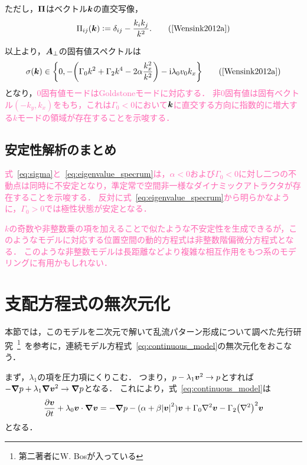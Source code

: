 \documentclass[12pt,dvipdfmx,svgnames,a4paper,uplatex]{ujarticle}
\theoremstyle{plain}
\begin{document}
ただし，\(\vb*{\Pi}\)はベクトル\(\vb*{k}\)の直交写像，
\begin{equation}
  \Pi_{ij}(\vb*{k}) \vcentcolon= \delta_{ij} - \frac{k_i k_j}{k^2}.
  \label{eq:Pi}
  \tag{\cite[Eq. 40]{Wensink2012a}}
\end{equation}

以上より，\(\vb*{A}_\bot\)の固有値スペクトルは
\begin{equation}
  \sigma(\vb*{k}) \in \qty{ 0, -\qty( \Gamma_0 k^2 + \Gamma_2 k^4 -2\alpha \frac{k_x^2}{k^2} ) -\mathrm{i} \lambda_0 v_0 k_x }
  \label{eq:eigenvalue_specrum}
  \tag{\cite[Eq. 42]{Wensink2012a}}
\end{equation}
となり，\textcolor{HotPink}{\(0\)固有値モードはGoldstoneモードに対応する．
非\(0\)固有値は固有ベクトル\((-k_y, k_x)\)をもち，これは\(\Gamma_0 < 0\)において\(\vb*{k}\)に直交する方向に指数的に増大する\(k\)モードの領域が存在することを示唆する．}


\subsection{安定性解析のまとめ}
\label{subsec:summary_stability_analysis}

\textcolor{HotPink}{
式~\ref{eq:sigma}と~\ref{eq:eigenvalue_specrum}は，\(\alpha < 0\)および\(\Gamma_0 < 0\)に対し二つの不動点は同時に不安定となり，準定常で空間非一様なダイナミックアトラクタが存在することを示唆する．
反対に式~\ref{eq:eigenvalue_specrum}から明らかなように，\(\Gamma_0 > 0\)では極性状態が安定となる．
}

\textcolor{HotPink}{
\(k\)の奇数や非整数乗の項を加えることで似たような不安定性を生成できるが，このようなモデルに対応する位置空間の動的方程式は非整数階偏微分方程式となる．
このような非整数モデルは長距離などより複雑な相互作用をもつ系のモデリングに有用かもしれない．
}

\section{支配方程式の無次元化}
\label{sec:governing_equation_nondimensionalisation}

本節では，このモデルを二次元で解いて乱流パターン形成について調べた先行研究~\footnote{第二著者にW. Bosが入っている}~\cite[脚注28]{James2017}を参考に，連続モデル方程式~\ref{eq:continuous_model}の無次元化をおこなう．

まず，\(\lambda_1\)の項を圧力項にくりこむ．
つまり，\(p - \lambda_1 \vb*{v}^2 \to p\)とすれば\(-\grad{p} + \lambda_1 \grad{\vb*{v}^2} \to \grad{p}\)となる．
これにより，式~\ref{eq:continuous_model}は
\begin{equation}
  \pdv{\vb*{v}}{t} + \lambda_0 \vb*{v} \cdot \grad{\vb*{v}} = -\grad{p} - (\alpha + \beta \abs{\vb*{v}}^2) \vb*{v} + \Gamma_0 \laplacian \vb*{v} - \Gamma_2 \qty(\laplacian)^2 \vb*{v}
  \label{eq:continuous_model_absorb_lambda1}
\end{equation}
となる．
\end{document}
